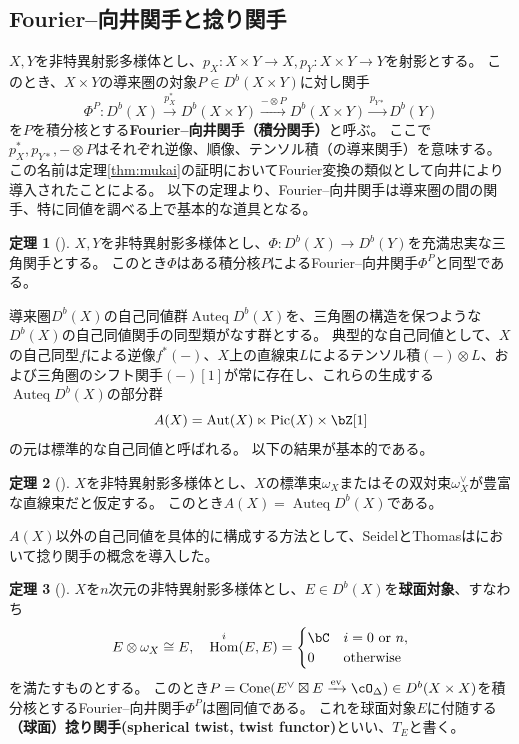\documentclass[a4j,uplatex,dvipdfmx]{jsarticle}
\numberwithin{equation}{section}
\numberwithin{figure}{section}
\theoremstyle{definition}
\newtheorem{theorem}{定理}[section]
\DeclareMathOperator{\Hom}{\mathrm{Hom}}
\DeclareMathOperator{\Auteq}{\mathrm{Auteq}}
\DeclareMathOperator{\Cone}{\mathrm{Cone}}
\DeclareMathOperator{\ev}{\mathrm{ev}}
\DeclareMathOperator{\Pic}{\mathrm{Pic}}
\DeclareMathOperator{\Aut}{\mathrm{Aut}}
\begin{document}
\subsection{Fourier--向井関手と捻り関手}
$X, Y$を非特異射影多様体とし、$p_X \colon X\times Y \to X, p_Y \colon X \times Y \to Y$を射影とする。
このとき、$X \times Y$の導来圏の対象$P \in D^b(X \times Y)$に対し関手
\begin{equation}
    \Phi^P \colon D^b(X) \xrightarrow{p_X^*} D^b(X \times Y) \xrightarrow{ - \otimes P} D^b(X \times Y) \xrightarrow{p_{Y*}} D^b(Y)
\end{equation}
を$P$を積分核とする\textbf{Fourier--向井関手（積分関手）}と呼ぶ。
ここで$p_X^*, p_{Y*}, - \otimes P$はそれぞれ逆像、順像、テンソル積（の導来関手）を意味する。
この名前は定理\ref{thm:mukai}の証明においてFourier変換の類似として向井により導入されたことによる。
以下の定理より、Fourier--向井関手は導来圏の間の関手、特に同値を調べる上で基本的な道具となる。
\begin{theorem}[\cite{MR1465519}]
    $X, Y$を非特異射影多様体とし、$\Phi \colon D^b(X) \to D^b(Y)$を充満忠実な三角関手とする。
    このとき$\Phi$はある積分核$P$によるFourier--向井関手$\Phi^P$と同型である。
\end{theorem}
導来圏$D^b(X)$の自己同値群$\Auteq D^b(X)$を、三角圏の構造を保つような$D^b(X)$の自己同値関手の同型類がなす群とする。
典型的な自己同値として、$X$の自己同型$f$による逆像$f^*(-)$、$X$上の直線束$L$によるテンソル積$(-)\otimes L$、および三角圏のシフト関手$(-)[1]$が常に存在し、これらの生成する$\Auteq D^b(X)$の部分群
\begin{equation}
    A(X) = \Aut(X) \ltimes \Pic(X) \times \bZ[1]
\end{equation}
の元は標準的な自己同値と呼ばれる。
以下の結果が基本的である。
\begin{theorem}[\cite{MR1818984}]\label{BO}
    $X$を非特異射影多様体とし、$X$の標準束$\omega_X$またはその双対束$\omega_X^\vee$が豊富な直線束だと仮定する。
    このとき$A(X) = \Auteq D^b(X)$である。
\end{theorem}
$A(X)$以外の自己同値を具体的に構成する方法として、SeidelとThomasは\cite{MR1831820}において捻り関手の概念を導入した。
\begin{theorem}[\cite{MR1831820}]
    $X$を$n$次元の非特異射影多様体とし、$E \in D^b(X)$を\textbf{球面対象}、すなわち\begin{equation}
        E \otimes \omega_X \cong E,\quad \Hom^i(E, E) = \begin{cases}
            \bC & i = \text{$0$ or $n$}, \\
            0   & \text{otherwise}
        \end{cases}
    \end{equation}を満たすものとする。
    このとき$P = \Cone(E^\vee \boxtimes E \xrightarrow{\ev} \cO_\Delta) \in D^b(X \times X)$を積分核とするFourier--向井関手$\Phi^P$は圏同値である。
    これを球面対象$E$に付随する\textbf{（球面）捻り関手(spherical twist, twist functor)}といい、$T_E$と書く。
\end{theorem}
\end{document}
